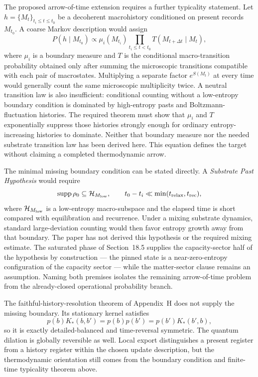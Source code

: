 \documentclass[11pt]{article}
\begin{document}
The proposed arrow-of-time extension requires a further typicality statement. Let $h=\{M_t\}_{t_i\le t\le t_0}$ be a decoherent macrohistory conditioned on present records $M_{t_0}$. A coarse Markov description would assign
\[
P(h\mid M_{t_0})\propto
\mu_i(M_{t_i})
\prod_{t_i\le t<t_0}T(M_{t+\Delta t}\mid M_t),
\]
where $\mu_i$ is a boundary measure and $T$ is the conditional macro-transition probability obtained only after summing the microscopic transitions compatible with each pair of macrostates. Multiplying a separate factor $e^{S(M_t)}$ at every time would generally count the same microscopic multiplicity twice. A neutral transition law is also insufficient: conditional counting without a low-entropy boundary condition is dominated by high-entropy pasts and Boltzmann-fluctuation histories. The required theorem must show that $\mu_i$ and $T$ exponentially suppress those histories strongly enough for ordinary entropy-increasing histories to dominate. Neither that boundary measure nor the needed substrate transition law has been derived here. This equation defines the target without claiming a completed thermodynamic arrow.

The minimal missing boundary condition can be stated directly. A \emph{Substrate Past Hypothesis} would require
\[
\operatorname{supp}\rho_0\subseteq\mathcal H_{M_{\rm low}},
\qquad
t_0-t_i\ll \min(t_{\rm relax},t_{\rm rec}),
\]
where $\mathcal H_{M_{\rm low}}$ is a low-entropy macro-subspace and the elapsed time is short compared with equilibration and recurrence. Under a mixing substrate dynamics, standard large-deviation counting would then favor entropy growth away from that boundary. The paper has not derived this hypothesis or the required mixing estimate. The saturated phase of Section~18.5 supplies the capacity-sector half of the hypothesis by construction --- the pinned state is a near-zero-entropy configuration of the capacity sector --- while the matter-sector clause remains an assumption. Naming both premises isolates the remaining arrow-of-time problem from the already-closed operational probability branch.

The faithful-history-resolution theorem of Appendix~H does not supply the missing boundary. Its stationary kernel satisfies
\[
p(b)K_*(b,b')=p(b)p(b')=p(b')K_*(b',b),
\]
so it is exactly detailed-balanced and time-reversal symmetric. The quantum dilation is globally reversible as well. Local export distinguishes a present register from a history register within the chosen update description, but the thermodynamic orientation still comes from the boundary condition and finite-time typicality theorem above.
\end{document}
